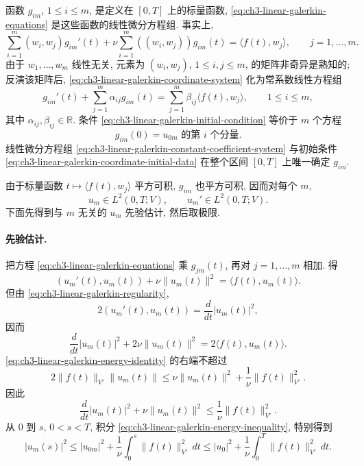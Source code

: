 函数 $g_{im}$, $1\leq i\leq m$, 是定义在 $[0,T]$ 上的标量函数, \eqref{eq:ch3-linear-galerkin-equations} 是这些函数的线性微分方程组. 事实上,
\begin{equation}
\sum_{i=1}^{m}(w_i,w_j)g_{im}'(t)
+\nu\sum_{i=1}^{m}((w_i,w_j))g_{im}(t)
=\langle f(t),w_j\rangle,
\qquad j=1,\ldots,m.
\label{eq:ch3-linear-galerkin-coordinate-system}
\end{equation}
由于 $w_1,\ldots,w_m$ 线性无关, 元素为 $(w_i,w_j)$, $1\leq i,j\leq m$, 的矩阵非奇异是熟知的; 反演该矩阵后, \eqref{eq:ch3-linear-galerkin-coordinate-system} 化为常系数线性方程组
\begin{equation}
g_{im}'(t)+\sum_{j=1}^{m}\alpha_{ij}g_{im}(t)
=\sum_{j=1}^{m}\beta_{ij}\langle f(t),w_j\rangle,
\qquad1\leq i\leq m,
\label{eq:ch3-linear-galerkin-constant-coefficient-system}
\end{equation}
其中 $\alpha_{ij},\beta_{ij}\in\mathbb R$. 条件 \eqref{eq:ch3-linear-galerkin-initial-condition} 等价于 $m$ 个方程
\begin{equation}
g_{im}(0)=u_{0m}\text{ 的第 }i\text{ 个分量}.
\label{eq:ch3-linear-galerkin-coordinate-initial-data}
\end{equation}
线性微分方程组 \eqref{eq:ch3-linear-galerkin-constant-coefficient-system} 与初始条件 \eqref{eq:ch3-linear-galerkin-coordinate-initial-data} 在整个区间 $[0,T]$ 上唯一确定 $g_{im}$.

由于标量函数 $t\mapsto\langle f(t),w_j\rangle$ 平方可积, $g_{im}$ 也平方可积, 因而对每个 $m$,
\begin{equation}
u_m\in L^2(0,T;V),
\qquad u_m'\in L^2(0,T;V).
\label{eq:ch3-linear-galerkin-regularity}
\end{equation}
下面先得到与 $m$ 无关的 $u_m$ 先验估计, 然后取极限.

\paragraph{先验估计.}
把方程 \eqref{eq:ch3-linear-galerkin-equations} 乘 $g_{jm}(t)$, 再对 $j=1,\ldots,m$ 相加. 得
\[
(u_m'(t),u_m(t))+\nu\lVert u_m(t)\rVert^2
=\langle f(t),u_m(t)\rangle.
\]
但由 \eqref{eq:ch3-linear-galerkin-regularity},
\[
2(u_m'(t),u_m(t))=\frac d{dt}|u_m(t)|^2,
\]
因而
\begin{equation}
\frac d{dt}|u_m(t)|^2+2\nu\lVert u_m(t)\rVert^2
=2\langle f(t),u_m(t)\rangle.
\label{eq:ch3-linear-galerkin-energy-identity}
\end{equation}
\eqref{eq:ch3-linear-galerkin-energy-identity} 的右端不超过
\[
2\lVert f(t)\rVert_{V'}\lVert u_m(t)\rVert
\leq\nu\lVert u_m(t)\rVert^2
+\frac1\nu\lVert f(t)\rVert_{V'}^2.
\]
因此
\begin{equation}
\frac d{dt}|u_m(t)|^2+\nu\lVert u_m(t)\rVert^2
\leq\frac1\nu\lVert f(t)\rVert_{V'}^2.
\label{eq:ch3-linear-galerkin-energy-inequality}
\end{equation}
从 $0$ 到 $s$, $0<s<T$, 积分 \eqref{eq:ch3-linear-galerkin-energy-inequality}, 特别得到
\begin{equation}
|u_m(s)|^2\leq|u_{0m}|^2
+\frac1\nu\int_0^s\lVert f(t)\rVert_{V'}^2\,dt
\leq|u_0|^2+\frac1\nu\int_0^T\lVert f(t)\rVert_{V'}^2\,dt.
\label{eq:ch3-linear-galerkin-pointwise-bound}
\end{equation}

